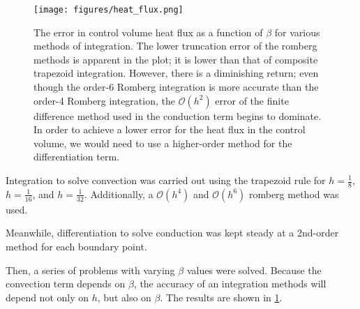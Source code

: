 \documentclass[10pt,letterpaper,notitlepage]{article}
\begin{document}
    \begin{figure}
        \centering
        \texttt{[image: figures/heat\_flux.png]}
        \caption[Heat flux of a control volume]{The error in control volume heat flux as a function of $\beta$ for various methods of integration. The lower truncation error of the romberg methods is apparent in the plot; it is lower than that of composite trapezoid integration. However, there is a diminishing return; even though the order-6 Romberg integration is more accurate than the order-4 Romberg integration, the $\mathcal{O}(h^2)$ error of the finite difference method used in the conduction term begins to dominate. In order to achieve a lower error for the heat flux in the control volume, we would need to use a higher-order method for the differentiation term.}
        \label{fig:integration5}
    \end{figure}

    Integration to solve convection was carried out using the trapezoid rule for $h=\frac{1}{8}$, $h=\frac{1}{16}$, and $h=\frac{1}{32}$. Additionally, a $\mathcal{O}(h^4)$ and $\mathcal{O}(h^6)$ romberg method was used.

    Meanwhile, differentiation to solve conduction was kept steady at a 2nd-order method for each boundary point.

    Then, a series of problems with varying $\beta$ values were solved. Because the convection term depends on $\beta$, the accuracy of an integration methods will depend not only on $h$, but also on $\beta$. The results are shown in \cref{fig:integration5}.
\end{document}
